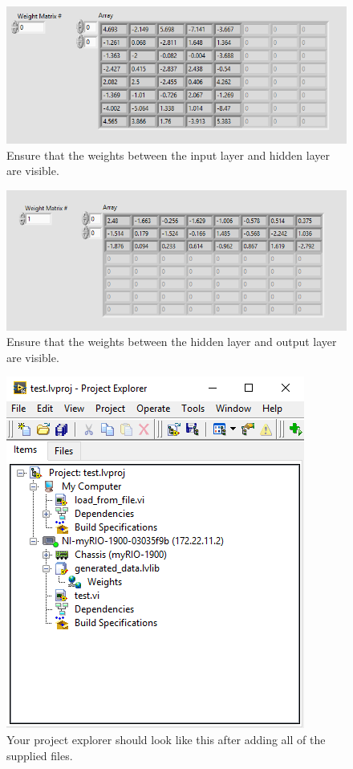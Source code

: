 \documentclass{article}
\begin{document}
\begin{figure}[h!]
\centering
\includegraphics[scale=0.7]{figs/_8.png}
\caption{Ensure that the weights between the input layer and hidden layer are visible.}
\label{fig:_8}
\end{figure}

\begin{figure}[h!]
\centering
\includegraphics[scale=0.7]{figs/_9.png}
\caption{Ensure that the weights between the hidden layer and output layer are visible.}
\label{fig:_9}
\end{figure}

\begin{figure}[h!]
\centering
\includegraphics[scale=0.7]{figs/_A.png}
\caption{Your project explorer should look like this after adding all of the supplied files.}
\label{fig:_A}
\end{figure}
\end{document}
